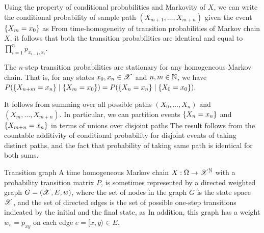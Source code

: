 \documentclass[12pt,aspectratio=169]{beamer}
\begin{document}
\begin{frame}
\begin{Proof}
Using the property of conditional probabilities and Markovity of $X$, 
we can write the conditional probability of sample path $(X_{m+1}, \dots, X_{m+n})$ given the event $\left\{X_m = x_0\right\}$ as 
From time-homogeneity of transition probabilities of Markov chain $X$, 
it follows that both the transition probabilities are identical and equal to $\prod_{i=1}^np_{x_{i-1},x_i}$. 
\end{Proof}
\end{frame}


\begin{frame}
\begin{cor}
The $n$-step transition probabilities are stationary for any homogeneous Markov chain.  
That is,  for any states $x_0,x_n \in \mathscr{X}$ and $n,m \in \mathbb{N}$, we have 
$
P(\left\{X_{n+m} = x_n\right\}\mid\left\{ X_m = x_0\right\}) 
=  P(\left\{X_{n} = x_n\right\}\mid\left\{ X_0 = x_0\right\}). 
$
\end{cor}
\end{frame}


\begin{frame}
\begin{Proof}
It follows from summing over all possible paths $(X_0, \dots, X_n)$ and $(X_m, \dots, X_{m+n})$. 
In particular, we can partition events $\left\{X_n=x_n\right\}$ and $\left\{X_{m+n}=x_n\right\}$ in terms of unions over disjoint paths 
The result follows from the countable additivity of conditional probability for disjoint events of taking distinct paths, 
and the fact that probability of taking same path is identical for both sums. 
\end{Proof}
\end{frame}


\begin{frame}{Transition graph} 
A time homogeneous Markov chain $X: \Omega\to\mathscr{X}^{\mathbb{N}}$ with a probability transition matrix $P$, 
is sometimes represented by a directed weighted graph $G = (\mathscr{X}, E, w)$, where the set of nodes in the graph $G$ is the state space $\mathscr{X}$, and the set of directed edges is the set of possible one-step transitions indicated by the initial and the final state, as 
\EQ{
E \triangleq \set{[x,y\rangle \in \sX \times \sX : p_{xy} > 0}. 
}
In addition, this graph has a weight $w_e = p_{xy}$ on each edge $e = [x,y\rangle \in E$. 
\end{frame}
\end{document}
